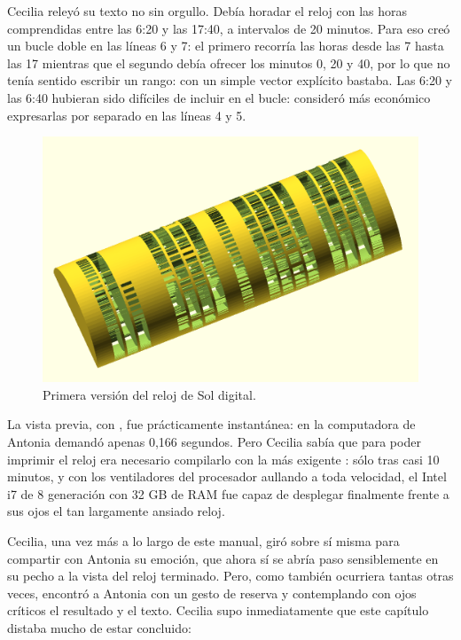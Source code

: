  Cecilia releyó su texto no sin orgullo. Debía horadar el reloj con
 las horas comprendidas entre las 6:20 y las 17:40, a intervalos de 20
 minutos. Para eso creó un bucle doble en las líneas 6 y 7: el primero
 recorría las horas desde las 7 hasta las 17 mientras que el segundo
 debía ofrecer los minutos 0, 20 y 40, por lo que no tenía sentido
 escribir un rango: con un simple vector explícito bastaba. Las 6:20 y
 las 6:40 hubieran sido difíciles de incluir en el bucle: consideró
 más económico expresarlas por separado en las líneas 4 y 5.

\begin{figure}[ht]
  \centering
  \includegraphics[width=.85\textwidth]{imagenes/reloj-completo-no-optimizado}
  \caption{Primera versión del reloj de Sol digital.}
  \label{fig:reloj-completo-no-optimizado}
\end{figure}


La vista previa, con , fue prácticamente instantánea: en
la computadora de Antonia demandó apenas 0,166 segundos. Pero Cecilia
sabía que para poder imprimir el reloj era necesario compilarlo con la
más exigente : sólo tras casi 10 minutos, y con los
ventiladores del procesador aullando a toda velocidad, el Intel i7 de
8 generación con 32 GB de RAM fue capaz de desplegar
finalmente frente a sus ojos el tan largamente ansiado reloj.

Cecilia, una vez más a lo largo de este manual, giró sobre sí misma
para compartir con Antonia su emoción, que ahora sí se abría paso
sensiblemente en su pecho a la vista del reloj terminado. Pero, como
también ocurriera tantas otras veces, encontró a Antonia con un gesto
de reserva y contemplando con ojos críticos el resultado y el
texto. Cecilia supo inmediatamente que este capítulo distaba mucho de
estar concluido:

